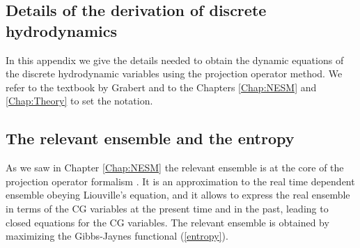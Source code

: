 \documentclass[b5paper,openright,11pt]{book}
\begin{document}
\begin{appendices}
\chapter{Details of the derivation of discrete hydrodynamics}
\label{Ap:KG}
In this  appendix we  give the  details needed  to obtain  the dynamic
equations of the discrete  hydrodynamic variables using the projection
operator   method.    We   refer   to   the    textbook   by   Grabert
\cite{Grabert1982}  and  to the Chapters \ref{Chap:NESM} and \ref{Chap:Theory} to set  the  notation.
\section{The relevant ensemble and the entropy}
As we saw in Chapter \ref{Chap:NESM}
the  relevant ensemble  is  at  the core  of  the projection  operator
formalism \cite{Grabert1982}. It is an  approximation to the real time
dependent  ensemble obeying  Liouville's  equation, and  it allows  to
express the real ensemble in terms  of the CG variables at the present
time and in the past, leading to closed equations for the CG variables.
The  relevant  ensemble is  obtained  by  maximizing the  Gibbs-Jaynes
functional (\ref{entropy}).


\end{appendices}
\end{document}
